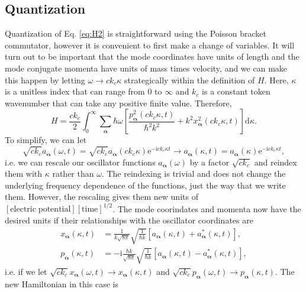 \documentclass{article}
\numberwithin{equation}{section}
\begin{document}
\subsection{Quantization}

Quantization of Eq. \eqref{eq:H2} is straightforward using the Poisson bracket commutator, however it is convenient to first make a change of variables. It will turn out to be important that the mode coordinates have units of length and the mode conjugate momenta have units of mass times velocity, and we can make this happen by letting $\omega\to ck_c\kappa$ strategically within the definition of $H$. Here, $\kappa$ is a unitless index that can range from $0$ to $\infty$ and $k_c$ is a constant token wavenumber that can take any positive finite value. Therefore,
\begin{equation}
H = \frac{ck_c}{2}\int_0^\infty\sum_{\bm{\alpha}}\hbar\omega\left[\frac{p_{\bm{\alpha}}^2(ck_c\kappa,t)}{\hbar^2k^2} + k^2x_{\bm{\alpha}}^2(ck_c\kappa,t)\right]\mathrm{d}\kappa.
\end{equation}
To simplify, we can let
\begin{equation}
\sqrt{ck_c}a_{\bm{\alpha}}(\omega,t) = \sqrt{ck_c}a_{\bm{\alpha}}(ck_c\kappa)\mathrm{e}^{-\mathrm{i}ck_c\kappa t} \to a_{\bm{\alpha}}(\kappa,t) = a_{\bm{\alpha}}(\kappa)\mathrm{e}^{-\mathrm{i}ck_c\kappa t},
\end{equation}
i.e. we can rescale our oscillator functions $a_{\bm{\alpha}}(\omega)$ by a factor $\sqrt{ck_c}$ and reindex them with $\kappa$ rather than $\omega$. The reindexing is trivial and does not change the underlying frequency dependence of the functions, just the way that we write them. However, the rescaling gives them new units of $[\mathrm{electric\;potential}][\mathrm{time}]^{1/2}$. The mode coorindates and momenta now have the desired units if their relationships with the oscillator coordinates are
\begin{equation}
\begin{split}
x_{\bm{\alpha}}(\kappa,t) &= \frac{1}{k\sqrt{8\pi}}\sqrt{\frac{1}{\hbar k}}\left[a_{\bm{\alpha}}(\kappa,t) + a_{\bm{\alpha}}^*(\kappa,t)\right],\\
p_{\bm{\alpha}}(\kappa,t) &= -\mathrm{i}\frac{\hbar k}{\sqrt{8\pi}}\sqrt{\frac{1}{\hbar k}}\left[a_{\bm{\alpha}}(\kappa,t) - a_{\bm{\alpha}}^*(\kappa,t)\right],
\end{split}
\end{equation}
i.e. if we let $\sqrt{ck_c}x_{\bm{\alpha}}(\omega,t)\to x_{\bm{\alpha}}(\kappa,t)$ and $\sqrt{ck_c}p_{\bm{\alpha}}(\omega,t)\to p_{\bm{\alpha}}(\kappa,t)$. The new Hamiltonian in this case is
\end{document}

